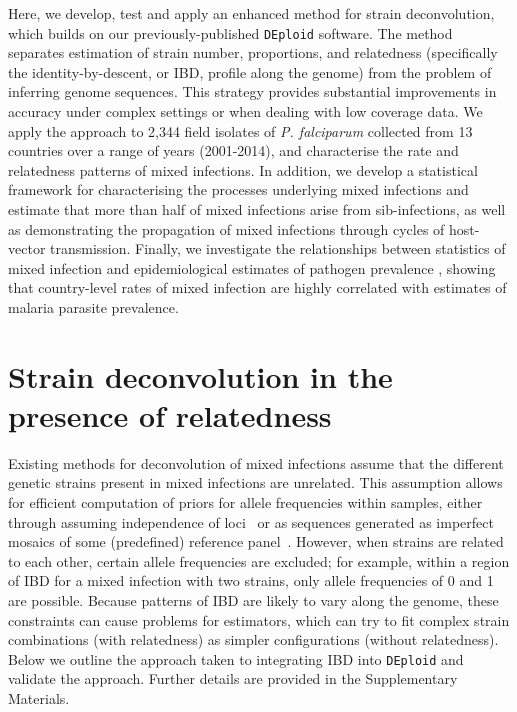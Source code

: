 \documentclass[9pt,lineno]{elife}
\begin{document}
Here, we develop, test and apply an enhanced method for strain deconvolution, which builds on our previously-published \texttt{DEploid} software.  The method separates estimation of strain number, proportions, and relatedness (specifically the identity-by-descent, or IBD, profile along the genome) from the problem of inferring genome sequences. This strategy provides substantial improvements in accuracy under complex settings or when dealing with low coverage data.  We apply the approach to 2,344 field isolates of {\it P. falciparum} collected from 13 countries over a range of years (2001-2014), and characterise the rate and relatedness patterns of mixed infections.  In addition, we develop a statistical framework for characterising the processes underlying mixed infections and estimate that more than half of mixed infections arise from sib-infections, as well as demonstrating the propagation of mixed infections through cycles of host-vector transmission.  Finally, we investigate the relationships between statistics of mixed infection and epidemiological estimates of pathogen prevalence \citep{MAP2017}, showing that country-level rates of mixed infection are highly correlated with estimates of malaria parasite prevalence.

\section{Strain deconvolution in the presence of relatedness}

Existing methods for deconvolution of mixed infections assume that the different genetic strains present in mixed infections are unrelated.  This assumption allows for efficient computation of priors for allele frequencies within samples, either through assuming independence of loci~\citep{Jack2016} or as sequences generated as imperfect mosaics of some (predefined) reference panel~\citep{Zhu2017}.  However, when strains are related to each other, certain allele frequencies are excluded; for example, within a region of IBD for a mixed infection with two strains, only allele frequencies of 0 and 1 are possible.  Because patterns of IBD are likely to vary along the genome, these constraints can cause problems for estimators, which can try to fit complex strain combinations (with relatedness) as simpler configurations (without relatedness).  Below we outline the approach taken to integrating IBD into \texttt{DEploid} and validate the approach.  Further details are provided in the Supplementary Materials.
\end{document}
